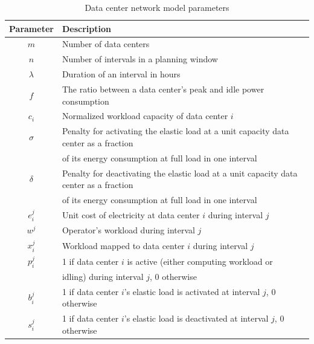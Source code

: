 \begin{table}
\begin{center}
\begin{tabular}{cl}
\hline Parameter & Description \\
\hline $m$ & Number of data centers \\
 $n$ & Number of intervals in a planning window \\
 $\lambda$ & Duration of an interval in hours \\
  $f$ & The ratio between a data center's peak and idle power consumption \\
 $c_i$ & Normalized workload capacity of data center $i$ \\
 $\sigma$ & Penalty for activating the elastic load at a unit capacity data center as a fraction\\
\ & of its energy consumption at full load in one interval \\
 $\delta$ & Penalty for deactivating the elastic load at a unit capacity data center as a fraction\\
\ & of its energy consumption at full load in one interval \\
 $e_i^j$ & Unit cost of electricity at data center $i$ during interval $j$ \\
 $w^j$ & Operator's workload during interval $j$ \\
 $x_i^j$ & Workload mapped to data center $i$ during interval $j$ \\
 $p_i^j$ & 1 if data center $i$ is active (either computing workload or\\
\ & idling) during interval $j$, $0$ otherwise \\
 $b_i^j$ & 1 if data center $i$'s elastic load is activated at interval $j$, $0$ otherwise \\
 $s_i^j$ & 1 if data center $i$'s elastic load is deactivated at interval $j$, $0$ otherwise \\
\hline
\end{tabular}
\caption{Data center network model parameters}
\label{tab:model}
\end{center}
\end{table}

